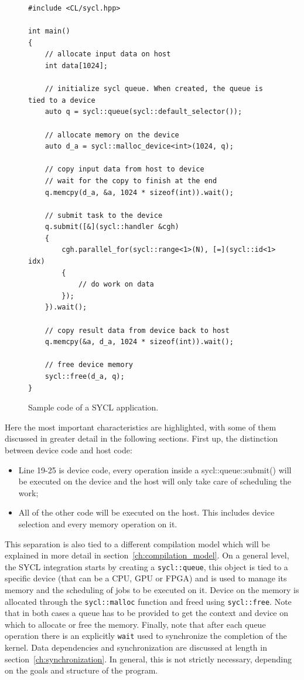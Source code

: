 \begin{figure}[ht!]
\renewcommand{\figurename}{Code}
\begin{verbatim}
#include <CL/sycl.hpp>

int main()
{
    // allocate input data on host
    int data[1024];
    
    // initialize sycl queue. When created, the queue is tied to a device
    auto q = sycl::queue(sycl::default_selector());
    
    // allocate memory on the device
    auto d_a = sycl::malloc_device<int>(1024, q);
    
    // copy input data from host to device
    // wait for the copy to finish at the end
    q.memcpy(d_a, &a, 1024 * sizeof(int)).wait();

    // submit task to the device
    q.submit([&](sycl::handler &cgh)
    {
        cgh.parallel_for(sycl::range<1>(N), [=](sycl::id<1> idx)
        {
            // do work on data
        });
    }).wait();
    
    // copy result data from device back to host
    q.memcpy(&a, d_a, 1024 * sizeof(int)).wait();
    
    // free device memory
    sycl::free(d_a, q);
}
\end{verbatim}
\caption{Sample code of a SYCL application.}
\label{code:simple_ex}
\end{figure}

Here the most important characteristics are highlighted, with some of them discussed in greater detail in the following sections. First up, the distinction between device code and host code: 
\begin{itemize}
    \item Line 19-25 is device code, every operation inside a sycl::queue::submit() will be executed on the device and the host will only take care of scheduling the work;
    \item All of the other code will be executed on the host. This includes device selection and every memory operation on it.
\end{itemize}
This separation is also tied to a different compilation model which will be explained in more detail in section~\ref{ch:compilation_model}. On a general level, the SYCL integration starts by creating a \Verb "sycl::queue", this object is tied to a specific device (that can be a CPU, GPU or FPGA) and is used to manage its memory and the scheduling of jobs to be executed on it. Device on the memory is allocated through the \Verb "sycl::malloc" function and freed using \Verb "sycl::free". Note that in both cases a queue has to be provided to get the context and device on which to allocate or free the memory. Finally, note that after each queue operation there is an explicitly \Verb "wait" used to synchronize the completion of the kernel. Data dependencies and synchronization are discussed at length in section~\ref{ch:synchronization}. In general, this is not strictly necessary, depending on the goals and structure of the program.

